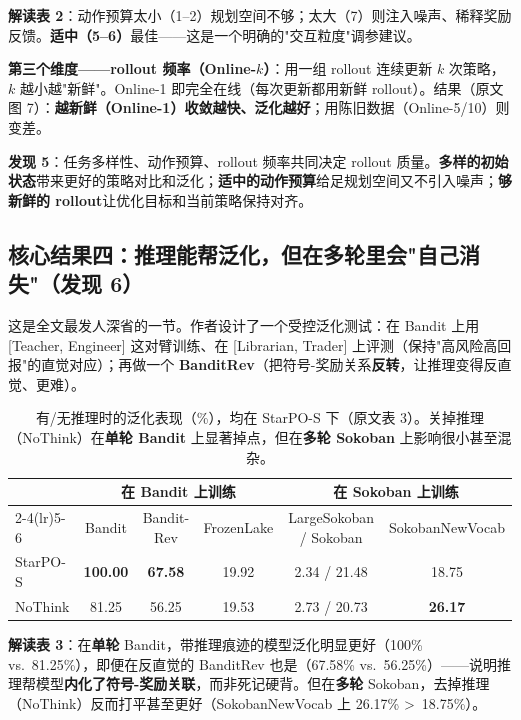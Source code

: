 \documentclass[11pt,UTF8,fontset=fandol]{ctexart}
\begin{document}
\textbf{解读表 2}：动作预算太小（1--2）规划空间不够；太大（7）则注入噪声、稀释奖励反馈。\textbf{适中（5--6）}最佳——这是一个明确的"交互粒度"调参建议。

\textbf{第三个维度——rollout 频率（Online-$k$）}：用一组 rollout 连续更新 $k$ 次策略，$k$ 越小越"新鲜"。Online-1 即完全在线（每次更新都用新鲜 rollout）。结果（原文图 7）：\textbf{越新鲜（Online-1）收敛越快、泛化越好}；用陈旧数据（Online-5/10）则变差。

\begin{findbox}
\textbf{发现 5}：任务多样性、动作预算、rollout 频率共同决定 rollout 质量。\textbf{多样的初始状态}带来更好的策略对比和泛化；\textbf{适中的动作预算}给足规划空间又不引入噪声；\textbf{够新鲜的 rollout}让优化目标和当前策略保持对齐。
\end{findbox}

\subsection{核心结果四：推理能帮泛化，但在多轮里会"自己消失"（发现 6）}

这是全文最发人深省的一节。作者设计了一个受控泛化测试：在 Bandit 上用 [Teacher, Engineer] 这对臂训练、在 [Librarian, Trader] 上评测（保持"高风险高回报"的直觉对应）；再做一个 \textbf{BanditRev}（把符号-奖励关系\textbf{反转}，让推理变得反直觉、更难）。

\begin{table}[H]\centering
\caption{有/无推理时的泛化表现（\%），均在 StarPO-S 下（原文表 3）。关掉推理（NoThink）在\textbf{单轮 Bandit} 上显著掉点，但在\textbf{多轮 Sokoban} 上影响很小甚至混杂。}
\begin{tabular}{lccccc}
\toprule
 & \multicolumn{3}{c}{在 Bandit 上训练} & \multicolumn{2}{c}{在 Sokoban 上训练} \\
\cmidrule(lr){2-4}\cmidrule(lr){5-6}
 & Bandit & Bandit-Rev & FrozenLake & LargeSokoban / Sokoban & SokobanNewVocab \\ \midrule
StarPO-S & \textbf{100.00} & \textbf{67.58} & 19.92 & 2.34 / 21.48 & 18.75 \\
NoThink  & 81.25 & 56.25 & 19.53 & 2.73 / 20.73 & \textbf{26.17} \\
\bottomrule
\end{tabular}
\end{table}

\textbf{解读表 3}：在\textbf{单轮} Bandit，带推理痕迹的模型泛化明显更好（100\% vs.\ 81.25\%），即便在反直觉的 BanditRev 也是（67.58\% vs.\ 56.25\%）——说明推理帮模型\textbf{内化了符号-奖励关联}，而非死记硬背。但在\textbf{多轮} Sokoban，去掉推理（NoThink）反而打平甚至更好（SokobanNewVocab 上 26.17\% \textgreater\ 18.75\%）。
\end{document}
